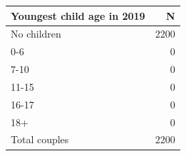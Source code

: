 
\begin{tabular}{lr}
\toprule
Youngest child age in 2019 & N\\
\midrule
No children & 2200\\
0-6 & 0\\
7-10 & 0\\
11-15 & 0\\
16-17 & 0\\
18+ & 0\\
Total couples & 2200\\
\bottomrule
\end{tabular}
